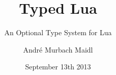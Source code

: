 \documentclass{beamer}
\begin{document}
\title{Typed Lua}
\subtitle{An Optional Type System for Lua}
\author{André Murbach Maidl}
\date{September 13th 2013}

\frame{\titlepage}
\end{document}
